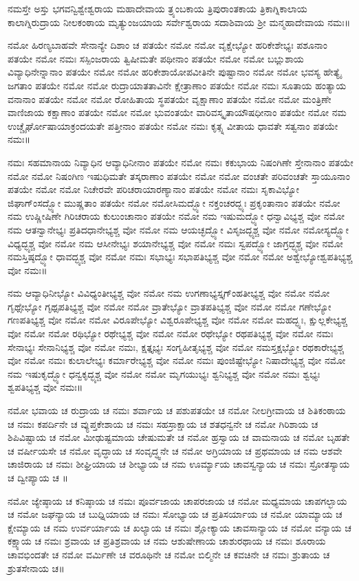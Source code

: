 ನಮಸ್ತೇ ಅಸ್ತು ಭಗವನ್ವಿಶ್ವೇಶ್ವರಾಯ ಮಹಾದೇವಾಯ ತ್ರ್ಯಂಬಕಾಯ ತ್ರಿಪುರಾಂತಕಾಯ ತ್ರಿಕಾಗ್ನಿಕಾಲಾಯ ಕಾಲಾಗ್ನಿರುದ್ರಾಯ ನೀಲಕಂಠಾಯ ಮೃತ್ಯುಂಜಯಾಯ ಸರ್ವೇಶ್ವರಾಯ ಸದಾಶಿವಾಯ ಶ್ರೀ ಮನ್ಮಹಾದೇವಾಯ ನಮಃ॥

ನಮೋ ಹಿರಣ್ಯಬಾಹವೇ ಸೇನಾನ್ಯೇ ದಿಶಾಂ ಚ ಪತಯೇ ನಮೋ ನಮೋ ವೃಕ್ಷೇಭ್ಯೋ ಹರಿಕೇಶೇಭ್ಯಃ ಪಶೂನಾಂ ಪತಯೇ ನಮೋ ನಮಃ ಸಸ್ಪಿಂಜರಾಯ ತ್ವಿಷೀಮತೇ ಪಥೀನಾಂ ಪತಯೇ ನಮೋ ನಮೋ ಬಭ್ಲುಶಾಯ ವಿವ್ಯಾಧಿನೇನ್ನಾನಾಂ ಪತಯೇ ನಮೋ ನಮೋ ಹರಿಕೇಶಾಯೋಪವೀತಿನೇ ಪುಷ್ಟಾನಾಂ ನಮೋ ನಮೋ ಭವಸ್ಯ ಹೇತ್ಯೈ ಜಗತಾಂ ಪತಯೇ ನಮೋ ನಮೋ ರುದ್ರಾಯಾತತಾವಿನೇ ಕ್ಷೇತ್ರಾಣಾಂ ಪತಯೇ ನಮೋ ನಮಃ ಸೂತಾಯ ಹಂತ್ಯಾಯ ವನಾನಾಂ ಪತಯೇ ನಮೋ ನಮೋ ರೋಹಿತಾಯ ಸ್ಥಪತಯೇ ವೃಕ್ಷಾಣಾಂ ಪತಯೇ ನಮೋ ನಮೋ ಮಂತ್ರಿಣೇ ವಾಣಿಜಾಯ ಕಕ್ಷಾಣಾಂ ಪತಯೇ ನಮೋ ನಮೋ ಭುವಂತಯೇ ವಾರಿವಸ್ಕೃತಾಯೌಷಧೀನಾಂ ಪತಯೇ ನಮೋ ನಮ ಉಚ್ಚೈರ್ಘೋಷಾಯಾಕ್ರಂದಯತೇ ಪತ್ತೀನಾಂ ಪತಯೇ ನಮೋ ನಮಃ ಕೃತ್ಸ್ನ ವೀತಾಯ ಧಾವತೇ ಸತ್ವನಾಂ ಪತಯೇ ನಮಃ॥

ನಮಃ ಸಹಮಾನಾಯ ನಿವ್ಯಾಧಿನ ಆವ್ಯಾಧಿನೀನಾಂ ಪತಯೇ ನಮೋ ನಮಃ ಕಕುಭಾಯ ನಿಷಂಗಿಣೇ ಸ್ತೇನಾನಾಂ ಪತಯೇ ನಮೋ ನಮೋ ನಿಷಂಗಿಣ ಇಷುಧಿಮತೇ ತಸ್ಕರಾಣಾಂ ಪತಯೇ ನಮೋ ನಮೋ ವಂಚತೇ ಪರಿವಂಚತೇ ಸ್ತಾಯೂನಾಂ ಪತಯೇ ನಮೋ ನಮೋ ನಿಚೇರವೇ ಪರಿಚರಾಯಾರಣ್ಯಾನಾಂ ಪತಯೇ ನಮೋ ನಮಃ ಸೃಕಾವಿಭ್ಯೋ ಜಿಘಾಗ್ಂಸದ್ಭ್ಯೋ ಮುಷ್ಣತಾಂ ಪತಯೇ ನಮೋ ನಮೋಸಿಮದ್ಭ್ಯೋ ನಕ್ತಂಚರದ್ಭ್ಯಃ ಪ್ರಕೃಂತಾನಾಂ ಪತಯೇ ನಮೋ ನಮ ಉಷ್ಣೀಷಿಣೇ ಗಿರಿಚರಾಯ ಕುಲುಂಚಾನಾಂ ಪತಯೇ ನಮೋ ನಮ ಇಷುಮದ್ಭ್ಯೋ ಧನ್ವಾವಿಭ್ಯಶ್ಚ ವೋ ನಮೋ ನಮ ಆತನ್ವಾನೇಭ್ಯಃ ಪ್ರತಿದಧಾನೇಭ್ಯಶ್ಚ ವೋ ನಮೋ ನಮ ಆಯಚ್ಛದ್ಭ್ಯೋ ವಿಸೃಜದ್ಭ್ಯಶ್ಚ ವೋ ನಮೋ ನಮೋಸ್ಯದ್ಭ್ಯೋ ವಿಧ್ಯದ್ಭ್ಯಶ್ಚ ವೋ ನಮೋ ನಮ ಆಸೀನೇಭ್ಯಃ ಶಯಾನೇಭ್ಯಶ್ಚ ವೋ ನಮೋ ನಮಃ ಸ್ವಪದ್ಭ್ಯೋ ಜಾಗ್ರದ್ಭ್ಯಶ್ಚ ವೋ ನಮೋ ನಮಸ್ತಿಷ್ಠದ್ಭ್ಯೋ ಧಾವದ್ಭ್ಯಶ್ಚ ವೋ ನಮೋ ನಮಃ ಸಭಾಭ್ಯಃ ಸಭಾಪತಿಭ್ಯಶ್ಚ ವೋ ನಮೋ ನಮೋ ಅಶ್ವೇಭ್ಯೋಶ್ವಪತಿಭ್ಯಶ್ಚ ವೋ ನಮಃ॥

ನಮ ಆವ್ಯಾಧಿನೀಭ್ಯೋ ವಿವಿಧ್ಯಂತೀಭ್ಯಶ್ಚ ವೋ ನಮೋ ನಮ ಉಗಣಾಭ್ಯಸ್ತೃಗ್ಂಹತೀಭ್ಯಶ್ಚ ವೋ ನಮೋ ನಮೋ ಗೃಥ್ಸೇಭ್ಯೋ ಗೃಥ್ಸಪತಿಭ್ಯಶ್ಚ ವೋ ನಮೋ ನಮೋ ವ್ರಾತೇಭ್ಯೋ ವ್ರಾತಪತಿಭ್ಯಶ್ಚ ವೋ ನಮೋ ನಮೋ ಗಣೇಭ್ಯೋ ಗಣಪತಿಭ್ಯಶ್ಚ ವೋ ನಮೋ ನಮೋ ವಿರೂಪೇಭ್ಯೋ ವಿಶ್ವರೂಪೇಭ್ಯಶ್ಚ ವೋ ನಮೋ ನಮೋ ಮಹದ್ಭ್ಯಃ, ಕ್ಷುಲ್ಲಕೇಭ್ಯಶ್ಚ ವೋ ನಮೋ ನಮೋ ರಥಿಭ್ಯೋ ರಥೇಭ್ಯಶ್ಚ ವೋ ನಮೋ ನಮೋ ರಥೇಭ್ಯೋ ರಥಪತಿಭ್ಯಶ್ಚ ವೋ ನಮೋ ನಮಃ ಸೇನಾಭ್ಯಃ ಸೇನಾನಿಭ್ಯಶ್ಚ ವೋ ನಮೋ ನಮಃ, ಕ್ಷತ್ತೃಭ್ಯಃ ಸಂಗೃಹೀತೃಭ್ಯಶ್ಚ ವೋ ನಮೋ ನಮಸ್ತಕ್ಷಭ್ಯೋ ರಥಕಾರೇಭ್ಯಶ್ಚ ವೋ ನಮೋ ನಮಃ ಕುಲಾಲೇಭ್ಯಃ ಕರ್ಮಾರೇಭ್ಯಶ್ಚ ವೋ ನಮೋ ನಮಃ ಪುಂಜಿಷ್ಟೇಭ್ಯೋ ನಿಷಾದೇಭ್ಯಶ್ಚ ವೋ ನಮೋ ನಮ ಇಷುಕೃದ್ಭ್ಯೋ ಧನ್ವಕೃದ್ಭ್ಯಶ್ಚ ವೋ ನಮೋ ನಮೋ ಮೃಗಯುಭ್ಯಃ ಶ್ವನಿಭ್ಯಶ್ಚ ವೋ ನಮೋ ನಮಃ ಶ್ವಭ್ಯಃ ಶ್ವಪತಿಭ್ಯಶ್ಚ ವೋ ನಮಃ॥

ನಮೋ ಭವಾಯ ಚ ರುದ್ರಾಯ ಚ ನಮಃ ಶರ್ವಾಯ ಚ ಪಶುಪತಯೇ ಚ ನಮೋ ನೀಲಗ್ರೀವಾಯ ಚ ಶಿತಿಕಂಠಾಯ ಚ ನಮಃ ಕಪರ್ದಿನೇ ಚ ವ್ಯುಪ್ತಕೇಶಾಯ ಚ ನಮಃ ಸಹಸ್ರಾಕ್ಷಾಯ ಚ ಶತಧನ್ವನೇ ಚ ನಮೋ ಗಿರಿಶಾಯ ಚ ಶಿಪಿವಿಷ್ಟಾಯ ಚ ನಮೋ ಮೀಢುಷ್ಟಮಾಯ ಚೇಷುಮತೇ ಚ ನಮೋ ಹ್ರಸ್ವಾಯ ಚ ವಾಮನಾಯ ಚ ನಮೋ ಬೃಹತೇ ಚ ವರ್ಷೀಯಸೇ ಚ ನಮೋ ವೃದ್ಧಾಯ ಚ ಸಂವೃದ್ಧ್ವನೇ ಚ ನಮೋ ಅಗ್ರಿಯಾಯ ಚ ಪ್ರಥಮಾಯ ಚ ನಮ ಆಶವೇ ಚಾಜಿರಾಯ ಚ ನಮಃ ಶೀಘ್ರಿಯಾಯ ಚ ಶೀಭ್ಯಾಯ ಚ ನಮ ಊರ್ಮ್ಯಾಯ ಚಾವಸ್ವನ್ಯಾಯ ಚ ನಮಃ ಸ್ರೋತಸ್ಯಾಯ ಚ ದ್ವೀಪ್ಯಾಯ ಚ ॥

ನಮೋ ಜ್ಯೇಷ್ಠಾಯ ಚ ಕನಿಷ್ಠಾಯ ಚ ನಮಃ ಪೂರ್ವಜಾಯ ಚಾಪರಜಾಯ ಚ ನಮೋ ಮಧ್ಯಮಾಯ ಚಾಪಗಲ್ಭಾಯ ಚ ನಮೋ ಜಘನ್ಯಾಯ ಚ ಬುಧ್ನಿಯಾಯ ಚ ನಮಃ ಸೋಭ್ಯಾಯ ಚ ಪ್ರತಿಸರ್ಯಾಯ ಚ ನಮೋ ಯಾಮ್ಯಾಯ ಚ ಕ್ಷೇಮ್ಯಾಯ ಚ ನಮ ಉರ್ವರ್ಯಾಯ ಚ ಖಲ್ಯಾಯ ಚ ನಮಃ ಶ್ಲೋಕ್ಯಾಯ ಚಾವಸಾನ್ಯಾಯ ಚ ನಮೋ ವನ್ಯಾಯ ಚ ಕಕ್ಷ್ಯಾಯ ಚ ನಮಃ ಶ್ರವಾಯ ಚ ಪ್ರತಿಶ್ರವಾಯ ಚ ನಮ ಆಶುಷೇಣಾಯ ಚಾಶುರಥಾಯ ಚ ನಮಃ ಶೂರಾಯ ಚಾವಭಿಂದತೇ ಚ ನಮೋ ವರ್ಮಿಣೇ ಚ ವರೂಥಿನೇ ಚ ನಮೋ ಬಿಲ್ಮಿನೇ ಚ ಕವಚಿನೇ ಚ ನಮಃ ಶ್ರುತಾಯ ಚ ಶ್ರುತಸೇನಾಯ ಚ॥

